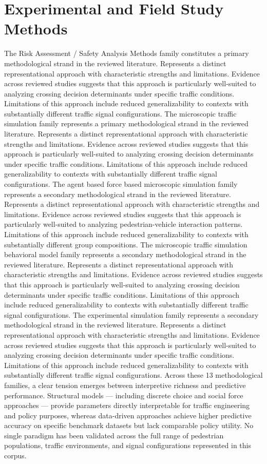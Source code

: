 \documentclass{article}
\begin{document}
\section{Experimental and Field Study Methods}
The Risk Assessment / Safety Analysis Methods family constitutes a primary methodological strand in the reviewed literature. Represents a distinct representational approach with characteristic strengths and limitations. Evidence across reviewed studies suggests that this approach is particularly well-suited to analyzing crossing decision determinants under specific traffic conditions. Limitations of this approach include reduced generalizability to contexts with substantially different traffic signal configurations. The microscopic traffic simulation family represents a primary methodological strand in the reviewed literature. Represents a distinct representational approach with characteristic strengths and limitations. Evidence across reviewed studies suggests that this approach is particularly well-suited to analyzing crossing decision determinants under specific traffic conditions. Limitations of this approach include reduced generalizability to contexts with substantially different traffic signal configurations. The agent based force based microscopic simulation family represents a secondary methodological strand in the reviewed literature. Represents a distinct representational approach with characteristic strengths and limitations. Evidence across reviewed studies suggests that this approach is particularly well-suited to analyzing pedestrian-vehicle interaction patterns. Limitations of this approach include reduced generalizability to contexts with substantially different group compositions. The microscopic traffic simulation behavioral model family represents a secondary methodological strand in the reviewed literature. Represents a distinct representational approach with characteristic strengths and limitations. Evidence across reviewed studies suggests that this approach is particularly well-suited to analyzing crossing decision determinants under specific traffic conditions. Limitations of this approach include reduced generalizability to contexts with substantially different traffic signal configurations. The experimental simulation family represents a secondary methodological strand in the reviewed literature. Represents a distinct representational approach with characteristic strengths and limitations. Evidence across reviewed studies suggests that this approach is particularly well-suited to analyzing crossing decision determinants under specific traffic conditions. Limitations of this approach include reduced generalizability to contexts with substantially different traffic signal configurations. Across these 13 methodological families, a clear tension emerges between interpretive richness and predictive performance. Structural models — including discrete choice and social force approaches — provide parameters directly interpretable for traffic engineering and policy purposes, whereas data-driven approaches achieve higher predictive accuracy on specific benchmark datasets but lack comparable policy utility. No single paradigm has been validated across the full range of pedestrian populations, traffic environments, and signal configurations represented in this corpus.
\end{document}
